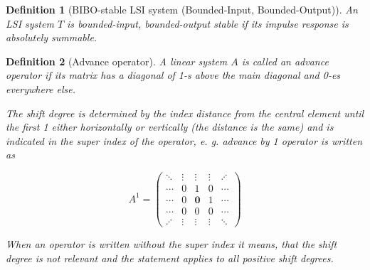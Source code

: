 \documentclass[a4paper]{article}
\theoremstyle{break}
\newtheorem{definition}{Definition}[section]
\theoremstyle{break}
\begin{document}
\begin{definition}[BIBO-stable LSI system (Bounded-Input, Bounded-Output)]
  An LSI system $T$ is \textit{bounded-input, bounded-output stable} if its impulse response is absolutely summable.
\end{definition}

\begin{definition}[Advance operator]
  A linear system $A$ is called an \textit{advance} operator if its matrix has a diagonal of 1-s above the main diagonal and 0-es everywhere else.

  The shift degree is determined by the index distance from the central element until the first 1 either horizontally or vertically (the distance is the same) and is indicated in the super index of the operator, e. g. advance by 1 operator is written as

  \begin{equation*}
    A^{1} = \begin{pmatrix*}
          \ddots  & \vdots & \vdots         & \vdots & \iddots \\
          \cdots  & 0      & 1              & 0      & \cdots \\
          \cdots  & 0      & \boldsymbol{0} & 1      & \cdots \\
          \cdots  & 0      & 0              & 0      & \cdots \\
          \iddots & \vdots & \vdots         & \vdots & \ddots
        \end{pmatrix*}
  \end{equation*}

  When an operator is written without the super index it means, that the shift degree is not relevant and the statement applies to all positive shift degrees.
\end{definition}
\end{document}

